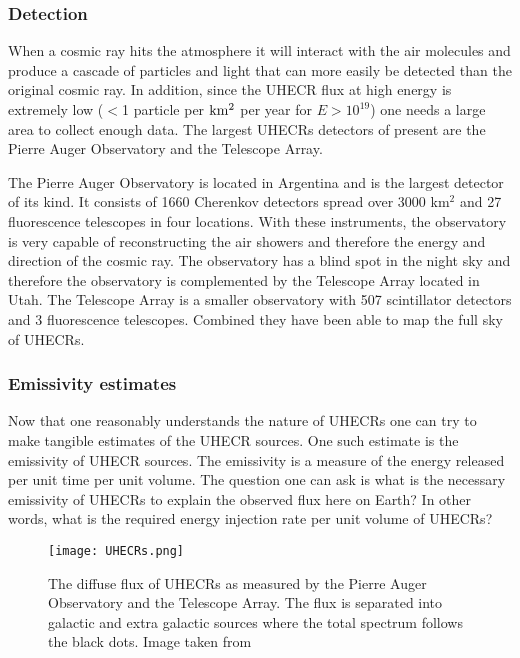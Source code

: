 




\subsubsection{Detection}
When a cosmic ray hits the atmosphere it will interact with the air molecules and produce a cascade of particles and light that can more easily be detected than 
the original cosmic ray. In addition, since the UHECR flux at high energy is extremely low ($<$1 particle per $\rm km^2$ per year for $E > 10^{19}$) one needs a large area to collect enough data. 
The largest UHECRs detectors of present are the Pierre Auger Observatory and the Telescope Array. 

The Pierre Auger Observatory is located in Argentina and is the largest detector of its kind. It consists of 1660  Cherenkov detectors spread over 3000 km$^2$ and 27 fluorescence telescopes in four locations. With 
these instruments, the observatory is very capable of reconstructing the air showers and therefore the energy and direction of the cosmic ray. The observatory has a blind spot in the night sky 
and therefore the observatory is complemented by the Telescope Array located in Utah. The Telescope Array is a smaller observatory with 507 scintillator detectors and 3 fluorescence telescopes. Combined they have been able to map the full sky of UHECRs.  

\subsubsection{Emissivity estimates}
\label{sec:emmisivity}

Now that one reasonably understands the nature of UHECRs one can try to make tangible estimates of the UHECR sources. One such
estimate is the emissivity of UHECR sources. The emissivity is a measure of the energy released per unit time per unit volume. The question 
one can ask is what is the necessary emissivity of UHECRs to explain the observed flux here on Earth? In other words, what is the required energy injection rate per unit volume of UHECRs?


\begin{figure}
    \centering
    \texttt{[image: UHECRs.png]}
    \caption{The diffuse flux of UHECRs as measured by the Pierre Auger Observatory and the Telescope Array. The flux is separated into galactic and extra galactic sources where the total spectrum follows the black dots. Image taken from \cite{Abdul_Halim_2023}}
    \label{fig:flux_UHECRs}
\end{figure}

